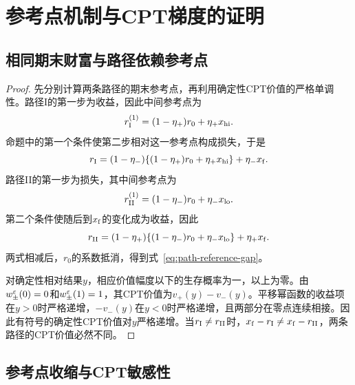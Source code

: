 \section{参考点机制与CPT梯度的证明}\label{app:reference-gradient}

\subsection{相同期末财富与路径依赖参考点}

\begin{proof}
先分别计算两条路径的期末参考点，再利用确定性CPT价值的严格单调性。路径I的第一步为收益，因此中间参考点为
\[
 r_{\rm I}^{(1)}=(1-\eta_+)r_0+\eta_+x_{\rm hi}.
\]
命题中的第一个条件使第二步相对这一参考点构成损失，于是
\[
 r_{\rm I}=(1-\eta_-)\{(1-\eta_+)r_0+\eta_+x_{\rm hi}\}+\eta_-x_{\rm f}.
\]
路径II的第一步为损失，其中间参考点为
\[
 r_{\rm II}^{(1)}=(1-\eta_-)r_0+\eta_-x_{\rm lo}.
\]
第二个条件使随后到$x_{\rm f}$的变化成为收益，因此
\[
 r_{\rm II}=(1-\eta_+)\{(1-\eta_-)r_0+\eta_-x_{\rm lo}\}+\eta_+x_{\rm f}.
\]
两式相减后，$r_0$的系数抵消，得到式~\eqref{eq:path-reference-gap}。

对确定性相对结果$y$，相应价值幅度以下的生存概率为一，以上为零。由$w_\pm^\varepsilon(0)=0$和$w_\pm^\varepsilon(1)=1$，其CPT价值为$v_+(y)-v_-(y)$。平移幂函数的收益项在$y>0$时严格递增，$-v_-(y)$在$y<0$时严格递增，且两部分在零点连续相接。因此有符号的确定性CPT价值对$y$严格递增。当$r_{\rm I}\ne r_{\rm II}$时，$x_{\rm f}-r_{\rm I}\ne x_{\rm f}-r_{\rm II}$，两条路径的CPT价值必然不同。
\end{proof}

\subsection{参考点收缩与CPT敏感性}


